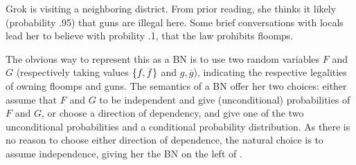 \documentclass[letterpaper]{article} %
\newif\ifprecompiledfigs
\theoremstyle{plain}
\theoremstyle{definition}
\theoremstyle{remark}
\begin{document}
\begin{example} \label{ex:guns-and-floomps}
Grok is visiting a neighboring district. From prior reading, she thinks it
likely (probability .95) that guns are illegal here. Some brief conversations
with locals lead her to believe with probility .1, that the law
prohibits floomps.

The obvious way to represent this as a BN is to use two random variables
$F$ and $G$ (respectively taking values $\{f, \smash{\overline f}\}$ and $g,
\overline g$), indicating the respective legalities of owning floomps and guns.
The semantics of a BN offer her two choices: either assume that $F$ and $G$
to be independent and give (unconditional) probabilities of $F$ and $G$, or
choose a direction of dependency, and give one of the two unconditional
probabilities and a conditional probability distribution. 
As there is no reason to choose either direction of dependence, the
natural choice is to 
assume independence, giving her the 
BN on the left of .

\begin{figure}[htb]
  \centering
\ifprecompiledfigs
~\vrule~
\else
\end{figure}
\end{example}
\end{document}
